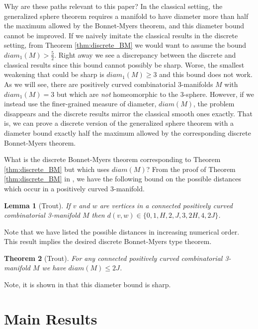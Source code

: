\documentclass[12pt]{article}
\newtheorem{thm}{Theorem}[section]
\newtheorem{lem}[thm]{Lemma}
\begin{document}
Why are these paths relevant to this paper? In the classical setting, the generalized sphere theorem requires a manifold to have diameter more than half the maximum allowed by the Bonnet-Myers theorem, and this diameter bound cannot be improved. If we naively imitate the classical results in the discrete setting, from Theorem \ref{thm:discrete_BM} we would want to assume the bound $diam_1(M)>\frac{5}{2}$. Right away we see a discrepancy between the discrete and classical results since this bound cannot possibly be sharp. Worse, the smallest weakening that could be sharp is $diam_1(M) \geq 3$ and this bound does not work. As we will see, there are positively curved combinatorial 3-manifolds $M$ with $diam_1(M)=3$ but which are {\em not} homeomorphic to the 3-sphere. However, if we instead use the finer-grained measure of diameter, $diam(M)$, the problem disappears and the discrete results mirror the classical smooth ones exactly. That is, we can prove a discrete version of the generalized sphere theorem with a diameter bound exactly half the maximum allowed by the corresponding discrete Bonnet-Myers theorem.

What is the discrete Bonnet-Myers theorem corresponding to Theorem \ref{thm:discrete_BM} but which uses $diam(M)$? From the proof of Theorem \ref{thm:discrete_BM} in \cite{Trout10}, we have the following bound on the possible distances which occur in a positively curved 3-manifold.

\begin{lem}[Trout] If $v$ and $w$ are vertices in a connected positively curved combinatorial 3-manifold $M$ then $d(v,w) \in \{0, 1, H, 2, J, 3, 2H, 4, 2J \}$.
\end{lem}

\noindent Note that we have listed the possible distances in increasing numerical order. This result implies the desired discrete Bonnet-Myers type theorem.

\begin{thm}[Trout] For any connected positively curved combinatorial 3-manifold $M$ we have $diam(M) \leq 2J$.
\label{thm:discrete_BM_expanded_paths}
\end{thm}

\noindent Note, it is shown in \cite{Trout10} that this diameter bound is sharp.

\section{Main Results}
\end{document}
